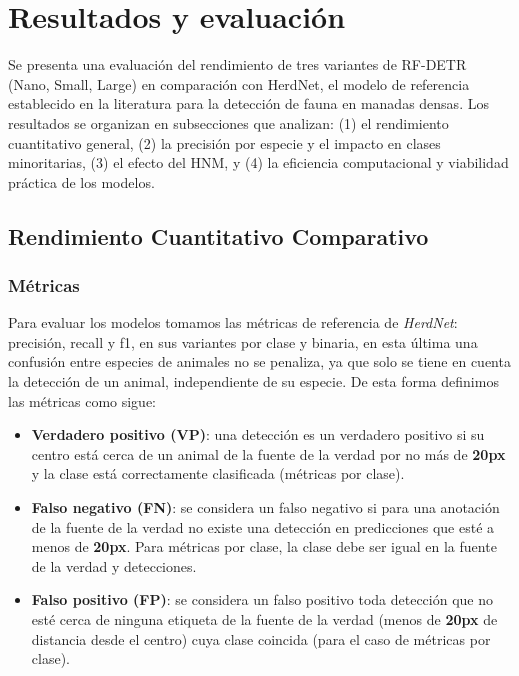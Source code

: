 \section{Resultados y evaluación}

Se presenta una evaluación del rendimiento de tres variantes de RF-DETR (Nano, Small, Large) en comparación con HerdNet, el modelo de referencia establecido en la literatura para la detección de fauna en manadas densas. Los resultados se organizan en subsecciones que analizan: (1) el rendimiento cuantitativo general, (2) la precisión por especie y el impacto en clases minoritarias, (3) el efecto del HNM, y (4) la eficiencia computacional y viabilidad práctica de los modelos.

\subsection{Rendimiento Cuantitativo Comparativo}

\subsubsection{Métricas}

Para evaluar los modelos tomamos las métricas de referencia de \textit{HerdNet}: precisión, recall y f1, en sus variantes por clase y binaria, en esta última una confusión entre especies de animales no se penaliza, ya que solo se tiene en cuenta la detección de un animal, independiente de su especie. De esta forma definimos las métricas como sigue:

\begin{itemize}
    \item \textbf{Verdadero positivo (VP)}: una detección es un verdadero positivo si su centro está cerca de un animal de la fuente de la verdad por no más de \textbf{20px} y la clase está correctamente clasificada (métricas por clase).

    \item \textbf{Falso negativo (FN)}: se considera un falso negativo si para una anotación de la fuente de la verdad no existe una detección en predicciones que esté a menos de \textbf{20px}. Para métricas por clase, la clase debe ser igual en la fuente de la verdad y detecciones.

    \item \textbf{Falso positivo (FP)}: se considera un falso positivo toda detección que no esté cerca de ninguna etiqueta de la fuente de la verdad (menos de \textbf{20px} de distancia desde el centro) cuya clase coincida (para el caso de métricas por clase).
\end{itemize}

